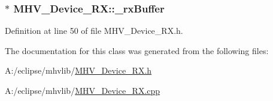 \hypertarget{class_m_h_v___device___r_x_a153f8f4c4f8bb0c9e71c86be0e90b15d}{
\subsubsection[{\-\_\-rx\-Buffer}]{$\ast$ {\bf \-M\-H\-V\-\_\-\-Device\-\_\-\-R\-X\-::\-\_\-rx\-Buffer}}}
\label{class_m_h_v___device___r_x_a153f8f4c4f8bb0c9e71c86be0e90b15d}


\-Definition at line 50 of file \-M\-H\-V\-\_\-\-Device\-\_\-\-R\-X.\-h.



\-The documentation for this class was generated from the following files\-:\begin{DoxyCompactItemize}
\item 
\-A\-:/eclipse/mhvlib/\hyperlink{_m_h_v___device___r_x_8h}{\-M\-H\-V\-\_\-\-Device\-\_\-\-R\-X.\-h}\item 
\-A\-:/eclipse/mhvlib/\hyperlink{_m_h_v___device___r_x_8cpp}{\-M\-H\-V\-\_\-\-Device\-\_\-\-R\-X.\-cpp}\end{DoxyCompactItemize}
